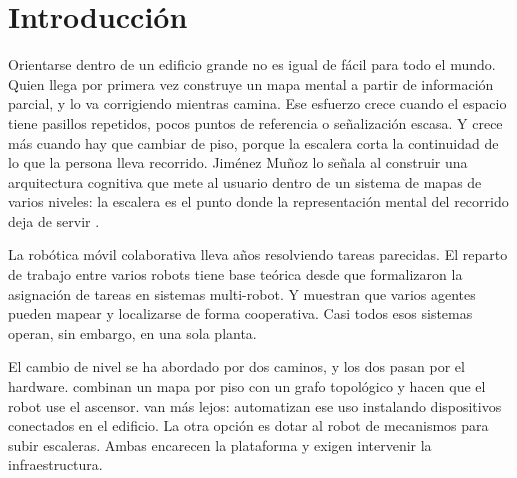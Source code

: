 %
\chapter*{Introducción}

Orientarse dentro de un edificio grande no es igual de fácil para todo el mundo.
Quien llega por primera vez construye un mapa mental a partir de información
parcial, y lo va corrigiendo mientras camina. Ese esfuerzo crece cuando el
espacio tiene pasillos repetidos, pocos puntos de referencia o señalización
escasa. Y crece más cuando hay que cambiar de piso, porque la escalera corta la
continuidad de lo que la persona lleva recorrido. Jiménez Muñoz lo señala al construir una
arquitectura cognitiva que mete al usuario dentro de un sistema de mapas de
varios niveles: la escalera es el punto donde la representación mental del
recorrido deja de servir \autocite{jimenez2024arquitectura}.

La robótica móvil colaborativa lleva años resolviendo tareas parecidas. El
reparto de trabajo entre varios robots tiene base teórica desde que
\textcite{gerkey2004taxonomy} formalizaron la asignación de tareas en sistemas
multi-robot. Y \textcite{varghese2023multirobot} muestran que varios agentes
pueden mapear y localizarse de forma cooperativa. Casi todos esos sistemas
operan, sin embargo, en una sola planta.

El cambio de nivel se ha abordado por dos caminos, y los dos pasan por el
hardware. \textcite{kim2024indoor} combinan un mapa por piso con un grafo
topológico y hacen que el robot use el ascensor. \textcite{song2024elevator} van
más lejos: automatizan ese uso instalando dispositivos conectados en el
edificio. La otra opción es dotar al robot de mecanismos para subir escaleras.
Ambas encarecen la plataforma y exigen intervenir la infraestructura.

